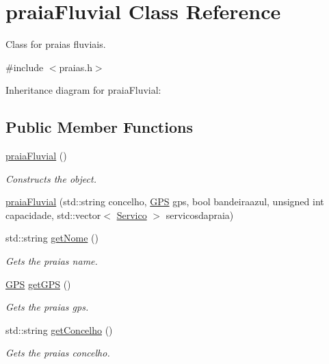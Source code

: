 \hypertarget{classpraiaFluvial}{}\section{praia\+Fluvial Class Reference}
\label{classpraiaFluvial}


Class for praias fluviais.  




{\ttfamily \#include $<$praias.\+h$>$}



Inheritance diagram for praia\+Fluvial\+:
\subsection*{Public Member Functions}
\begin{DoxyCompactItemize}
\item 
\hyperlink{classpraiaFluvial_ab88371de4e3b999d9150d1ee5d7f7673}{praia\+Fluvial} ()
\begin{DoxyCompactList}\small\item\em Constructs the object. \end{DoxyCompactList}\item 
\hyperlink{classpraiaFluvial_a75582da73fa39908bb5232f06fcede91}{praia\+Fluvial} (std\+::string concelho, \hyperlink{classGPS}{G\+PS} gps, bool bandeiraazul, unsigned int capacidade, std\+::vector$<$ \hyperlink{classServico}{Servico} $>$ servicosdapraia)
\item 
std\+::string \hyperlink{classpraiaFluvial_a79762e3121b2339a952c92e82890824f}{get\+Nome} ()
\begin{DoxyCompactList}\small\item\em Gets the praia\textquotesingle{}s name. \end{DoxyCompactList}\item 
\hyperlink{classGPS}{G\+PS} \hyperlink{classpraiaFluvial_ab1fc0621e1e2d7f1a11ef05ccc2c3af0}{get\+G\+PS} ()
\begin{DoxyCompactList}\small\item\em Gets the praia\textquotesingle{}s gps. \end{DoxyCompactList}\item 
std\+::string \hyperlink{classpraiaFluvial_aac6c4fd01595f9455f43b8bddb069d9d}{get\+Concelho} ()
\begin{DoxyCompactList}\small\item\em Gets the praia\textquotesingle{}s concelho. \end{DoxyCompactList}\item 

\end{DoxyCompactItemize}
